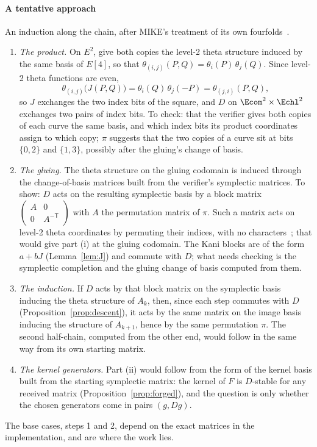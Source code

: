 {    \paragraph{A tentative approach}
    An induction along the chain, after MIKE's treatment of its own
    fourfolds~\cite[Proposition G.3 and Lemma G.3]{BDD+26}.
    \begin{enumerate}
        \item \emph{The product.} On $E^2$, give both copies the level-2 theta
        structure induced by the same basis of $E[4]$, so that
        $\theta_{(i,j)}(P, Q) = \theta_i(P)\,\theta_j(Q)$. Since level-2 theta
        functions are even,
        \[
        \theta_{(i,j)}\bigl(J(P, Q)\bigr) = \theta_i(Q)\,\theta_j(-P)
        = \theta_{(j,i)}(P, Q),
        \]
        so $J$ exchanges the two index bits of the square, and $D$ on $\Ecom^2
        \times \Echl^2$ exchanges two pairs of index bits. To check: that the
        verifier gives both copies of each curve the same basis, and which
        index bits its product coordinates assign to which copy; $\pi$ suggests
        that the two copies of a curve sit at bits $\{0, 2\}$ and $\{1, 3\}$,
        possibly after the gluing's change of basis.
        \item \emph{The gluing.} The theta structure on the gluing codomain is
        induced through the change-of-basis matrices built from the verifier's
        symplectic matrices. To show: $D$ acts on the resulting symplectic
        basis by a block matrix $\left(\begin{smallmatrix} A & 0 \\ 0 &
            A^{-\mathsf{T}} \end{smallmatrix}\right)$ with $A$ the permutation
        matrix of $\pi$. Such a matrix acts on level-2 theta coordinates by
        permuting their indices, with no characters~\cite[Theorem 12]{Dar24};
        that would give part (i) at the gluing codomain. The Kani blocks are of
        the form $a + bJ$ (Lemma~\ref{lem:J}) and commute with $D$; what needs
        checking is the symplectic completion and the gluing change of basis
        computed from them.
        \item \emph{The induction.} If $D$ acts by that block matrix on the
        symplectic basis inducing the theta structure of $A_k$, then, since
        each step commutes with $D$ (Proposition~\ref{prop:descent}), it acts
        by the same matrix on the image basis inducing the structure of
        $A_{k+1}$, hence by the same permutation $\pi$. The second half-chain,
        computed from the other end, would follow in the same way from its own
        starting matrix.
        \item \emph{The kernel generators.} Part (ii) would follow from the
        form of the kernel basis built from the starting symplectic matrix:
        the kernel of $F$ is $D$-stable for any received matrix
        (Proposition~\ref{prop:forged}), and the question is only whether the
        chosen generators come in pairs $(g, Dg)$.
    \end{enumerate}
    The base cases, steps 1 and 2, depend on the exact matrices in the
    implementation, and are where the work lies.
}
